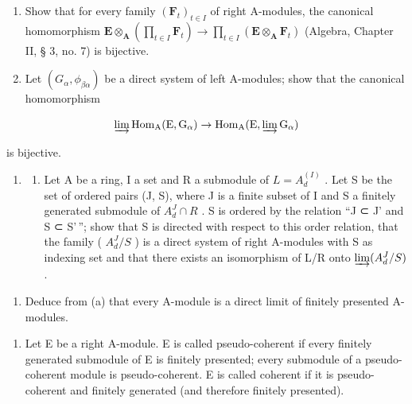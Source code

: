 \begin{enumerate}
\def\labelenumi{(\alph{enumi})}
\item
  Show that for every family \((\mathbf{F}_t)_{t \in I}\) of right A-modules, the canonical homomorphism \(\mathbf{E} \otimes_{\mathbf{A}} \left( \prod_{t \in I} \mathbf{F}_t \right) \to \prod_{t \in I} (\mathbf{E} \otimes_{\mathbf{A}} \mathbf{F}_t)\) (Algebra, Chapter II, § 3, no. 7) is bijective.
\item
  Let \((G_{\alpha}, \phi_{\beta\alpha})\) be a direct system of left A-modules; show that the canonical homomorphism
\end{enumerate}

\[
\varinjlim \operatorname{Hom} _ {\mathrm{A}} (\mathrm{E}, \mathrm{G} _ {\alpha}) \rightarrow \operatorname{Hom} _ {\mathrm{A}} (\mathrm{E}, \varinjlim \mathrm{G} _ {\alpha})
\]

is bijective.

\begin{enumerate}
\def\labelenumi{\arabic{enumi}.}
\setcounter{enumi}{9}
\tightlist
\item
  \begin{enumerate}
  \def\labelenumii{(\alph{enumii})}
  \tightlist
  \item
    Let A be a ring, I a set and R a submodule of \(L = A_{d}^{(I)}\) . Let S be the set of ordered pairs (J, S), where J is a finite subset of I and S a finitely generated submodule of \(A_{d}^{J} \cap R\) . S is ordered by the relation ``J ⊂ J' and S ⊂ S'\,''; show that S is directed with respect to this order relation, that the family ( \(A_{d}^{J}/S\) ) is a direct system of right A-modules with S as indexing set and that there exists an isomorphism of L/R onto \(\varinjlim (A_{d}^{J}/S)\) .
  \end{enumerate}
\end{enumerate}

\begin{enumerate}
\def\labelenumi{(\alph{enumi})}
\setcounter{enumi}{1}
\tightlist
\item
  Deduce from (a) that every A-module is a direct limit of finitely presented A-modules.
\end{enumerate}

\begin{enumerate}
\def\labelenumi{\arabic{enumi}.}
\setcounter{enumi}{10}
\tightlist
\item
  Let E be a right A-module. E is called pseudo-coherent if every finitely generated submodule of E is finitely presented; every submodule of a pseudo-coherent module is pseudo-coherent. E is called coherent if it is pseudo-coherent and finitely generated (and therefore finitely presented).
\end{enumerate}

